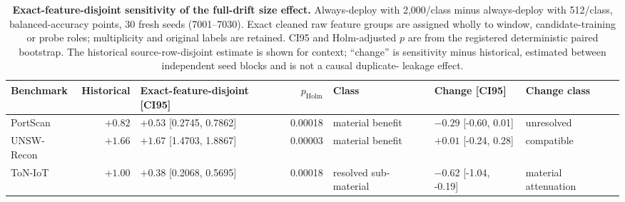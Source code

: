 \begin{table}[t]
\centering
\caption{\textbf{Exact-feature-disjoint sensitivity of the full-drift size effect.}
Always-deploy with 2{,}000/class minus always-deploy with 512/class, balanced-accuracy
points, 30 fresh seeds (7001--7030). Exact cleaned raw feature groups are assigned wholly
to window, candidate-training or probe roles; multiplicity and original labels are retained.
CI95 and Holm-adjusted $p$ are from the registered deterministic paired bootstrap. The
historical source-row-disjoint estimate is shown for context; ``change'' is sensitivity
minus historical, estimated between independent seed blocks and is not a causal duplicate-
leakage effect.}
\label{tab:value_disjoint_main}
\footnotesize
\setlength{\tabcolsep}{3pt}
\begin{tabular}{l r l r l l l}
\toprule
Benchmark & Historical & Exact-feature-disjoint [CI95] & $p_{\mathrm{Holm}}$ & Class & Change [CI95] & Change class \\
\midrule
PortScan & $+0.82$ & $+0.53$ [0.2745, 0.7862] & 0.00018 & material benefit & $-0.29$ [-0.60, 0.01] & unresolved \\
UNSW-Recon & $+1.66$ & $+1.67$ [1.4703, 1.8867] & 0.00003 & material benefit & $+0.01$ [-0.24, 0.28] & compatible \\
ToN-IoT & $+1.00$ & $+0.38$ [0.2068, 0.5695] & 0.00018 & resolved sub-material & $-0.62$ [-1.04, -0.19] & material attenuation \\
\bottomrule
\end{tabular}
\end{table}
